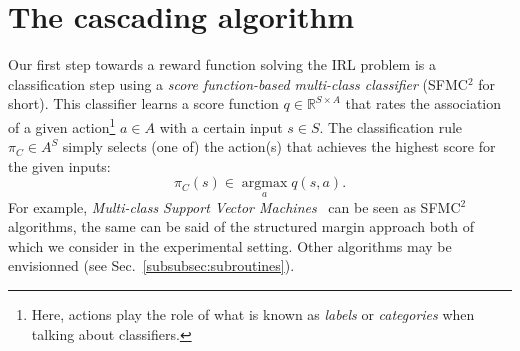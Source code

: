 \documentclass{llncs}
\newcommand{\argmax}{\operatorname*{argmax}} %
\begin{document}
\section{The cascading algorithm}
\label{sec:algo}
Our first step towards a reward function solving the IRL problem is a classification step using a \emph{score function-based multi-class classifier} (SFMC$^2$ for short). This classifier learns a score function $q\in\mathbb{R}^{S\times A}$ that rates the association of a given action\footnote{Here, actions play the role of what is known as {\it labels} or {\it categories} when talking about classifiers.} $a\in A$ with a certain input $s\in S$. The classification rule $\pi_C\in A^S$ simply selects (one of) the action(s) that achieves the highest score for the given inputs:
\begin{equation}
  \label{eq:greedy2}
\pi_C(s) \in \argmax_a q(s,a).
\end{equation}
For example, \emph{Multi-class Support Vector Machines}~\cite{guermeur2011generic} can be seen as SFMC$^2$ algorithms, the same can be said of the structured margin approach \cite{taskar2005learning} both of which we consider in the experimental setting. Other algorithms may be envisionned (see Sec.~\ref{subsubsec:subroutines}). 
\end{document}
